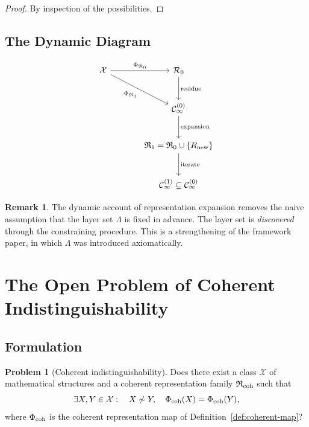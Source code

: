 \documentclass[11pt,a4paper]{article}
\theoremstyle{definition}
\newtheorem{remark}[definition]{Remark}
\newtheorem{problem}[definition]{Problem}
\theoremstyle{plain}
\newcommand{\Lam}{\Lambda}
\newcommand{\Rcal}{\mathcal{R}}
\newcommand{\Ccal}{\mathcal{C}}
\newcommand{\Xcal}{\mathcal{X}}
\newcommand{\Rfrak}{\mathfrak{R}}
\newcommand{\Phimap}{\Phi}
\newcommand{\simadm}{\sim}
\begin{document}
\begin{proof}
By inspection of the possibilities.
\end{proof}

\subsection{The Dynamic Diagram}

\begin{equation}
\begin{tikzcd}[row sep=large, column sep=large]
  \Xcal \arrow[r, "\Phimap_{\Rfrak_0}"] \arrow[dr, "\Phimap_{\Rfrak_1}"']
    & \Rcal_0 \arrow[d, "\text{residue}"] \\
  & \Ccal_\infty^{(0)}
    \arrow[d, "\text{expansion}"] \\
  & \Rfrak_1 = \Rfrak_0 \cup \{R_{\rm new}\}
    \arrow[d, "\text{iterate}"] \\
  & \Ccal_\infty^{(1)} \subsetneq \Ccal_\infty^{(0)}
\end{tikzcd}
\end{equation}

\begin{remark}
The dynamic account of representation expansion removes the naive
assumption that the layer set $\Lam$ is fixed in advance. The layer
set is \emph{discovered} through the constraining procedure. This
is a strengthening of the framework paper, in which $\Lam$ was
introduced axiomatically.
\end{remark}

\section{The Open Problem of Coherent Indistinguishability}
\label{sec:open}

\subsection{Formulation}

\begin{problem}[Coherent indistinguishability]\label{prob:indist}
Does there exist a class $\Xcal$ of mathematical structures and a
coherent representation family $\Rfrak_{\rm coh}$ such that
\[
  \exists X, Y \in \Xcal : \quad
  X \not\simadm Y, \quad
  \Phimap_{\rm coh}(X) = \Phimap_{\rm coh}(Y),
\]
where $\Phimap_{\rm coh}$ is the coherent representation map of
Definition~\ref{def:coherent-map}?
\end{problem}
\end{document}
